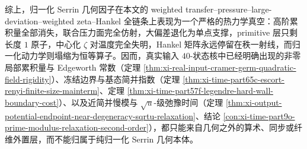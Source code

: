 \noindent
综上，归一化 Serrin 几何因子在本文的 weighted transfer--pressure--large-deviation--weighted zeta--Hankel 全链条上表现为一个严格的热力学真空：高阶累积量全部消失，联合压力面完全仿射，大偏差退化为单点支撑，primitive 层只剩长度 \(1\) 原子，中心化 \(\zeta\) 对温度完全失明，Hankel 矩阵永远停留在秩一射线，而归一化动力学则塌缩为恒等算子。因而，真实输入 \(40\)-状态核中已经明确出现的非零局部累积量与 Edgeworth 常数（定理 \ref{thm:xi-real-input-cramer-germ-quadratic-field-rigidity}）、冻结边界与基态简并指数（定理 \ref{thm:xi-time-part65c-escort-renyi-finite-size-mainterm}、定理 \ref{thm:xi-time-part57f-legendre-hard-wall-boundary-cost}）、以及近简并慢模与 \(\sqrt u\)-级弛豫时间（定理 \ref{thm:xi-output-potential-endpoint-near-degeneracy-sqrtu-relaxation}、结论 \ref{con:xi-time-part9o-prime-modulus-relaxation-second-order}），都只能来自几何之外的算术、同步或纤维外置层，而不能归属于纯归一化 Serrin 几何本体。

\endinput
